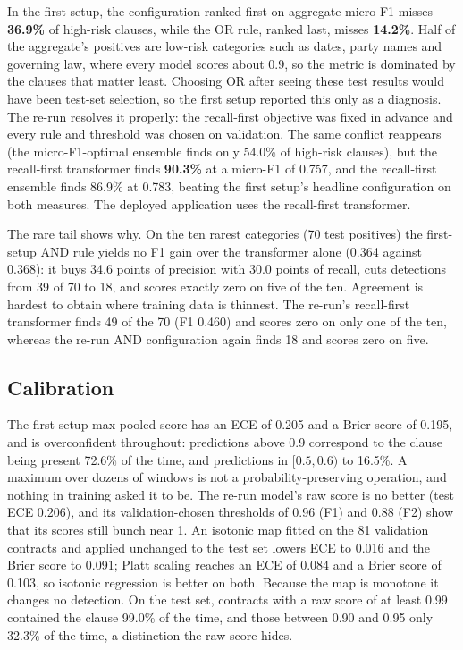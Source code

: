 \documentclass[journal]{IEEEtran}
\begin{document}
In the first setup, the configuration ranked first on aggregate micro-F1 misses \textbf{36.9\%} of
high-risk clauses, while the OR rule, ranked last, misses \textbf{14.2\%}. Half of the aggregate's
positives are low-risk categories such as dates, party names and governing law, where every model
scores about 0.9, so the metric is dominated by the clauses that matter least. Choosing OR after
seeing these test results would have been test-set selection, so the first setup reported this
only as a diagnosis. The re-run resolves it properly: the recall-first objective was fixed in
advance and every rule and threshold was chosen on validation. The same conflict reappears (the
micro-F1-optimal ensemble finds only 54.0\% of high-risk clauses), but the recall-first transformer
finds \textbf{90.3\%} at a micro-F1 of 0.757, and the recall-first ensemble finds 86.9\% at 0.783,
beating the first setup's headline configuration on both measures. The deployed application uses
the recall-first transformer.

The rare tail shows why. On the ten rarest categories (70 test positives) the first-setup AND rule
yields no F1 gain over the transformer alone (0.364 against 0.368): it buys 34.6 points of precision
with 30.0 points of recall, cuts detections from 39 of 70 to 18, and scores exactly zero on five of
the ten. Agreement is hardest to obtain where training data is thinnest. The re-run's recall-first
transformer finds 49 of the 70 (F1 0.460) and scores zero on only one of the ten, whereas the
re-run AND configuration again finds 18 and scores zero on five.

\subsection{Calibration}
The first-setup max-pooled score has an ECE of 0.205 and a Brier score of 0.195, and is
overconfident throughout: predictions above 0.9 correspond to the clause being present 72.6\% of
the time, and predictions in $[0.5,0.6)$ to 16.5\%. A maximum over dozens of windows is not a
probability-preserving operation, and nothing in training asked it to be. The re-run model's raw
score is no better (test ECE 0.206), and its validation-chosen thresholds of 0.96 (F1) and 0.88
(F2) show that its scores still bunch near 1. An isotonic map fitted on the 81 validation contracts
and applied unchanged to the test set lowers ECE to 0.016 and the Brier score to 0.091; Platt
scaling reaches an ECE of 0.084 and a Brier score of 0.103, so isotonic regression is better on both. Because the map is monotone it changes no detection. On the test set,
contracts with a raw score of at least 0.99 contained the clause 99.0\% of the time, and those
between 0.90 and 0.95 only 32.3\% of the time, a distinction the raw score hides.
\end{document}
